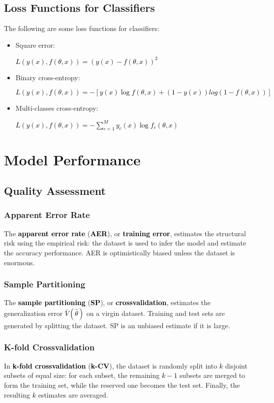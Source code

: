 \documentclass{article}
\newcommand{\bb}[1]{\textcolor{black}{\textbf{#1}}}
\newcommand{\rr}[1]{\textcolor{black}{#1}}
\newcommand{\cc}[1]{\begin{center}\textcolor{black}{#1}\end{center}}
\begin{document}
\subsection{Loss Functions for Classifiers}
The following are some loss functions for classifiers:
\begin{itemize}
    \item Square error:
        \cc{$L(y(x),f(\theta,x)) = (y(x)-f(\theta,x))^2 $}
    \item Binary cross-entropy:
        \cc{$L(y(x),f(\theta,x)) = -[y(x)\log f(\theta,x)+(1-y(x))log(1-f(\theta,x))]$}
    \item Multi-classes cross-entropy:
        \cc{$L(y(x),f(\theta,x)) = -\displaystyle\sum^M_{c=1} y_c(x)\log f_c(\theta,x)$}
\end{itemize}

\newpage

\section{Model Performance}

\subsection{Quality Assessment}
\subsubsection{Apparent Error Rate}
The \bb{apparent error rate} (\bb{AER}), or \bb{training error}, estimates the structural risk using the empirical risk: the dataset is used to infer the model and estimate the accuracy performance. AER is optimistically biased unless the dataset is enormous.
\subsubsection{Sample Partitioning}
The \bb{sample partitioning} (\bb{SP}), or \bb{crossvalidation}, estimates the generalization error \rr{$\bar{V}(\hat{\theta})$} on a virgin dataset. Training and test sets are generated by splitting the dataset. SP is an unbiased estimate if it is large.
\subsubsection{K-fold Crossvalidation}
In \bb{k-fold crossvalidation} (\bb{k-CV}), the dataset is randomly split into \rr{$k$} disjoint subsets of equal size: for each subset, the remaining \rr{$k-1$} subsets are merged to form the training set, while the reserved one becomes the test set. Finally, the resulting \rr{$k$} estimates are averaged.
\end{document}
